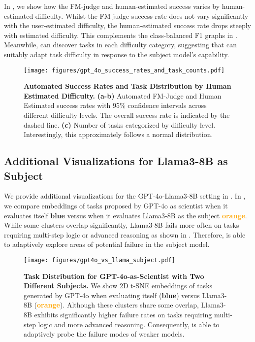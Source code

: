In , we show how the FM-judge and human-estimated success varies by human-estimated difficulty.
Whilst the FM-judge success rate does not vary significantly with the user-estimated difficulty, the human-estimated success rate drops steeply with estimated difficulty.
This complements the class-balanced F1 graphs in .
Meanwhile, \ouralgo can discover tasks in each difficulty category, suggesting that \ouralgo can suitably adapt task difficulty in response to the subject model's capability.

\begin{figure}[h!]
\centering
\texttt{[image: figures/gpt\_4o\_success\_rates\_and\_task\_counts.pdf]}
\caption{
\textbf{Automated Success Rates and Task Distribution by Human Estimated Difficulty.}
\textbf{(a-b)} Automated FM-Judge and Human Estimated success rates with 95\% confidence intervals across different difficulty levels. The overall success rate is indicated by the dashed line.
\textbf{(c)} Number of tasks categorized by difficulty level. Interestingly, this approximately follows a normal distribution.
}
\label{fig:success_rates_and_task_counts}
\end{figure}

\subsection{Additional Visualizations for Llama3-8B as Subject}
\label{appsubsec:llama_vis}

We provide additional visualizations for the GPT-4o-Llama3-8B setting in .
In , we compare embeddings of tasks proposed by GPT-4o as scientist when it evaluates itself \textcolor{Cerulean}{\textbf{blue}} versus when it evaluates Llama3-8B as the subject \textcolor{Orange}{\textbf{orange}}.
While some clusters overlap significantly, Llama3-8B fails more often on tasks requiring multi-step logic or advanced reasoning as shown in .
Therefore, \ouralgo is able to adaptively explore areas of potential failure in the subject model.

\begin{figure}[h!]
\centering
\texttt{[image: figures/gpt4o\_vs\_llama\_subject.pdf]}
\caption{
\textbf{Task Distribution for GPT-4o-as-Scientist with Two Different Subjects.}
We show 2D t-SNE embeddings of tasks generated by GPT-4o when evaluating itself
(\textcolor{Cerulean}{\textbf{blue}}) versus Llama3-8B
(\textcolor{Orange}{\textbf{orange}}).
Although these clusters share some overlap, Llama3-8B exhibits significantly higher failure rates on tasks requiring multi-step logic and more advanced reasoning.
Consequently, \ouralgo is able to adaptively probe the failure modes of weaker models.
}
\label{fig:llama_subject_embedding}
\end{figure}


